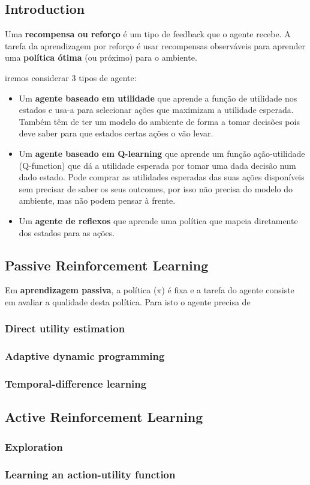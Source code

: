 \documentclass[11pt]{article}
\begin{document}
\subsection{Introduction}

Uma \textbf{recompensa ou reforço} é um tipo de feedback que o agente recebe. A tarefa da aprendizagem por reforço é usar recompensas observáveis para aprender uma \textbf{política ótima} (ou próximo) para o ambiente.\vspace{4pt}

iremos considerar 3 tipos de agente:
\begin{itemize}
    \item Um \textbf{agente baseado em utilidade} que aprende a função de utilidade nos estados e usa-a para selecionar ações que maximizam a utilidade esperada. Também têm de ter um modelo do ambiente de forma a tomar decisões pois deve saber para que estados certas ações o vão levar.
    \item Um \textbf{agente baseado em Q-learning} que aprende um função ação-utilidade (Q-function) que dá a utilidade esperada por tomar uma dada decisão num dado estado. Pode comprar as utilidades esperadas das suas ações disponíveis sem precisar de saber os seus outcomes, por isso não precisa do modelo do ambiente, mas não podem pensar à frente.
    \item Um \textbf{agente de reflexos} que aprende uma política que mapeia diretamente dos estados para as ações.
\end{itemize}

\subsection{Passive Reinforcement Learning}

Em \textbf{aprendizagem passiva}, a política ($\pi$) é fixa e a tarefa do agente consiste em avaliar a qualidade desta política. Para isto o agente precisa de 

\subsubsection{Direct utility estimation}

\subsubsection{Adaptive dynamic programming}

\subsubsection{Temporal-difference learning}

\subsection{Active Reinforcement Learning}

\subsubsection{Exploration}

\subsubsection{Learning an action-utility function}

\newpage
\listoftodos
\end{document}

